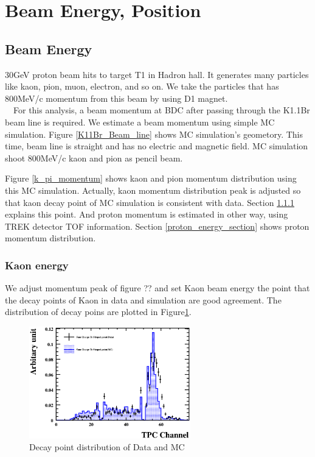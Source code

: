    \section{Beam Energy, Position}
   \subsection{Beam Energy}
 
   30GeV proton beam hits to target T1 in Hadron hall.
   It generates many particles like kaon, pion, muon, electron, and
   so on.
   We take the particles that has 800MeV/c momentum from this beam by
   using D1 magnet.\\
   \ \ For this analysis, a beam momentum at BDC after passing through the
   K1.1Br beam line is required.
   We estimate a beam momentum using simple MC simulation.
   Figure \ref{K11Br_Beam_line} shows MC simulation's geometory.
   This time, beam line is straight and has no electric and magnetic
   field.
   MC simulation shoot 800MeV/c kaon and pion as pencil beam.

   Figure \ref{k_pi_momentum} shows kaon and pion momentum distribution
   using this MC simulation.
   Actually, kaon momentum distribution peak is adjusted so that kaon
   decay point of MC simulation is consistent with data.
   Section \ref{kaon_energy_section} explains this point.
   And proton momentum is estimated in other way, using TREK detector
   TOF information.
   Section \ref{proton_energy_section} shows proton momentum distribution.

   \subsubsection{Kaon energy}\label{kaon_energy_section}

We adjust momentum peak of figure ?? and set Kaon beam energy  the point that the decay points of Kaon in data and simulation are good agreement. The distribution of decay poins are plotted in Figure\ref{DecayPoint_hough}.
\begin{figure}[!htb]
  \begin{center}
    \includegraphics[width=70mm]{fig/cdp_hough.eps}
  \end{center}
  \caption{Decay point distribution of Data and MC}
  \label{DecayPoint_hough}
\end{figure}

